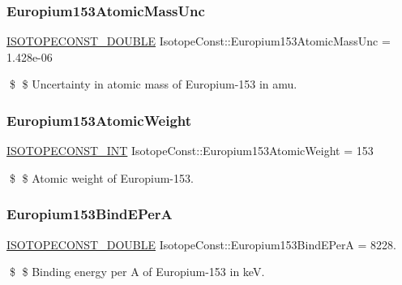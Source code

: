 \subsubsection{\texorpdfstring{Europium153\+Atomic\+Mass\+Unc}{Europium153AtomicMassUnc}}
{\footnotesize\ttfamily \mbox{\hyperlink{group___isotope_const-_macros_ga8f45a7272ce02c0b4c65c44636ed719a}{I\+S\+O\+T\+O\+P\+E\+C\+O\+N\+S\+T\+\_\+\+D\+O\+U\+B\+LE}} Isotope\+Const\+::\+Europium153\+Atomic\+Mass\+Unc = 1.\+428e-\/06}

\$ \$ Uncertainty in atomic mass of Europium-\/153 in amu. \mbox{\label{group___isotope_const-_europium-_eu153_ga053ccff1f9054ba50c2621331ce7424f}} 
\subsubsection{\texorpdfstring{Europium153\+Atomic\+Weight}{Europium153AtomicWeight}}
{\footnotesize\ttfamily \mbox{\hyperlink{group___isotope_const-_macros_ga5f18360b3e99483a35c32d789e62621c}{I\+S\+O\+T\+O\+P\+E\+C\+O\+N\+S\+T\+\_\+\+I\+NT}} Isotope\+Const\+::\+Europium153\+Atomic\+Weight = 153}

\$ \$ Atomic weight of Europium-\/153. \mbox{\label{group___isotope_const-_europium-_eu153_gae691d20ae214b8b41c8ce46b52458095}} 
\subsubsection{\texorpdfstring{Europium153\+Bind\+E\+PerA}{Europium153BindEPerA}}
{\footnotesize\ttfamily \mbox{\hyperlink{group___isotope_const-_macros_ga8f45a7272ce02c0b4c65c44636ed719a}{I\+S\+O\+T\+O\+P\+E\+C\+O\+N\+S\+T\+\_\+\+D\+O\+U\+B\+LE}} Isotope\+Const\+::\+Europium153\+Bind\+E\+PerA = 8228.}

\$ \$ Binding energy per A of Europium-\/153 in keV. \mbox{\label{group___isotope_const-_europium-_eu153_gaf2f8b5dfc0199e3399fe65510990df9f}} 
